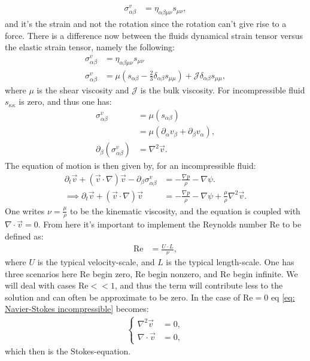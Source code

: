 \documentclass[a4paper]{article}
\begin{document}
\begin{align*}
    \sigma_{\alpha\beta}^v &= \eta_{\alpha\beta\mu\nu}s_{\mu\nu},
\end{align*}and it's the strain and not the rotation since the rotation can't give rise to a force. There is a difference now between the fluids dynamical strain tensor versus the elastic strain tensor, namely the following:
\begin{align*}
    \sigma_{\alpha\beta}^v &= \eta_{\alpha\beta\mu\nu}s_{\mu\nu}\\
    \sigma_{\alpha\beta}^v &= \mu\left(s_{\alpha\beta} - \frac{2}{3}\delta_{\alpha\beta}s_{\mu\mu}\right) + \mathcal{J}\delta_{\alpha\beta}s_{\mu\mu},
\end{align*}where $\mu$ is the shear viscosity and $\mathcal{J}$ is the bulk viscosity. For incompressible fluid $s_{\kappa\kappa}$ is zero, and thus one has:
\begin{align*}
    \sigma_{\alpha\beta}^v &= \mu\left(s_{\alpha\beta}\right)\\
    &=\mu\left(\partial_\alpha v_\beta + \partial_\beta v_\alpha\right),\\
    \partial_\beta\left(\sigma_{\alpha\beta}^v\right) &= \nabla^2\vec{v}.
\end{align*}The equation of motion is then given by, for an incompressible fluid:
\begin{align}
    \partial_t\vec{v} + \left(\vec{v}\cdot\nabla\right)\vec{v} - \partial_\beta\sigma_{\alpha\beta}^v &= -\frac{\nabla p}{\rho} - \nabla\psi.\nonumber\\
    \implies \partial_t\vec{v} + \left(\vec{v}\cdot\nabla\right)\vec{v} &= -\frac{\nabla p}{\rho} - \nabla\psi + \frac{\mu}{\rho}\nabla^2\vec{v}.\label{eq: Navier-Stokes incompressible}
\end{align}One writes $\nu = \frac{\mu}{\rho}$ to be the kinematic viscosity, and the equation is coupled with $\nabla\cdot\vec{v} = 0$.
From here it's important to implement the Reynolds number $\text{Re}$ to be defined as:
\begin{align*}
    \text{Re} &= \frac{U\cdot L}{\nu},
\end{align*}where $U$ is the typical velocity-scale, and $L$ is the typical length-scale. One has three scenarios here $\text{Re}$ begin zero, $\text{Re}$ begin nonzero, and $\text{Re}$ begin infinite.
We will deal with cases $\text{Re}<< 1$, and thus the term will contribute less to the solution and can often be approximate to be zero.
In the case of $\text{Re} = 0$ eq \eqref{eq: Navier-Stokes incompressible} becomes:
\begin{align}
    \begin{cases}
        \nabla^2\vec{v} &= 0,\\
        \nabla\cdot\vec{v} &= 0,
    \end{cases}\label{eq: Stokes equation}
\end{align}which then is the Stokes-equation.
\end{document}
